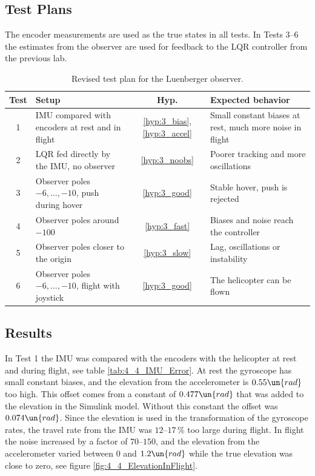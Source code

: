 \subsection{Test Plans}

The encoder measurements are used as the true states in all tests.
In Tests 3--6 the estimates from the observer are used for feedback to the LQR controller from the previous lab.

\begin{table}[htbp]
    \centering
    \caption{Revised test plan for the Luenberger observer.}
    \label{tab:4_3_Test_Plans}
    \begin{tabularx}{\textwidth}{c X c X}
        \toprule
        \textbf{Test} & \textbf{Setup} & \textbf{Hyp.} & \textbf{Expected behavior} \\
        \midrule
        1 & IMU compared with encoders at rest and in flight & \ref{hyp:3_bias}, \ref{hyp:3_accel} & Small constant biases at rest, much more noise in flight \\
        2 & LQR fed directly by the IMU, no observer & \ref{hyp:3_noobs} & Poorer tracking and more oscillations \\
        3 & Observer poles \(-6,\dots,-10\), push during hover & \ref{hyp:3_good} & Stable hover, push is rejected \\
        4 & Observer poles around \(-100\) & \ref{hyp:3_fast} & Biases and noise reach the controller \\
        5 & Observer poles closer to the origin & \ref{hyp:3_slow} & Lag, oscillations or instability \\
        6 & Observer poles \(-6,\dots,-10\), flight with joystick & \ref{hyp:3_good} & The helicopter can be flown \\
        \bottomrule
    \end{tabularx}
\end{table}

\subsection{Results}

In Test 1 the IMU was compared with the encoders with the helicopter at rest and during flight, see table \ref{tab:4_4_IMU_Error}.
At rest the gyroscope has small constant biases, and the elevation from the accelerometer is \(0.55\un{rad}\) too high.
This offset comes from a constant of \(0.477\un{rad}\) that was added to the elevation in the Simulink model. Without this constant the offset was \(0.074\un{rad}\).
Since the elevation is used in the transformation of the gyroscope rates, the travel rate from the IMU was \(12\)--\(17\,\%\) too large during flight.
In flight the noise increased by a factor of \(70\)--\(150\), and the elevation from the accelerometer varied between \(0\) and \(1.2\un{rad}\) while the true elevation was close to zero, see figure \ref{fig:4_4_ElevationInFlight}.

